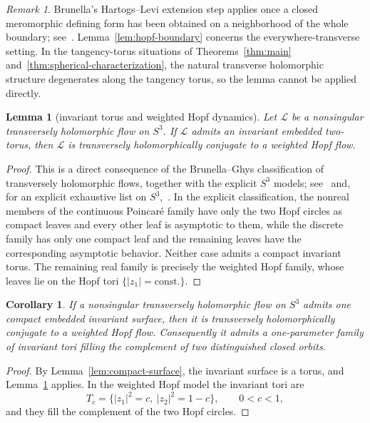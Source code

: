 \documentclass[11pt,reqno]{article}
\newtheorem{lemma}[theorem]{Lemma}
\newtheorem{corollary}{Corollary}
\theoremstyle{remark}
\newtheorem*{remark}{Remark}
\begin{document}
\begin{remark}
Brunella's Hartogs--Levi extension step applies once a closed meromorphic defining form has been obtained on a neighborhood of the whole boundary; see~\cite[pp.~124--125]{Brunella1995}. Lemma~\ref{lem:hopf-boundary} concerns the everywhere-transverse setting. In the tangency-torus situations of Theorems~\ref{thm:main} and~\ref{thm:spherical-characterization}, the natural transverse holomorphic structure degenerates along the tangency torus, so the lemma cannot be applied directly.
\end{remark}

\begin{lemma}[invariant torus and weighted Hopf dynamics]\label{lem:torus-hopf}
Let $\mathcal L$ be a nonsingular transversely holomorphic flow on $S^3$. If $\mathcal L$ admits an invariant embedded two-torus, then $\mathcal L$ is transversely holomorphically conjugate to a weighted Hopf flow.
\end{lemma}

\begin{proof}
This is a direct consequence of the Brunella--Ghys classification of transversely holomorphic flows, together with the explicit $S^3$ models; see~\cite{BrunellaGhys1995,Ghys1996} and, for an explicit exhaustive list on $S^3$,~\cite[Theorem~4.9 and Section~6]{GeigesGonzalo2016}. In the explicit classification, the nonreal members of the continuous Poincar\'e family have only the two Hopf circles as compact leaves and every other leaf is asymptotic to them, while the discrete family has only one compact leaf and the remaining leaves have the corresponding asymptotic behavior. Neither case admits a compact invariant torus. The remaining real family is precisely the weighted Hopf family, whose leaves lie on the Hopf tori $\{|z_1|=\mathrm{const.}\}$.
\end{proof}

\begin{corollary}\label{cor:many-tori}
If a nonsingular transversely holomorphic flow on $S^3$ admits one compact embedded invariant surface, then it is transversely holomorphically conjugate to a weighted Hopf flow. Consequently it admits a one-parameter family of invariant tori filling the complement of two distinguished closed orbits.
\end{corollary}

\begin{proof}
By Lemma~\ref{lem:compact-surface}, the invariant surface is a torus, and Lemma~\ref{lem:torus-hopf} applies. In the weighted Hopf model the invariant tori are
\[
 T_c=\{|z_1|^2=c,\ |z_2|^2=1-c\},\qquad 0<c<1,
\]
and they fill the complement of the two Hopf circles.
\end{proof}
\end{document}
